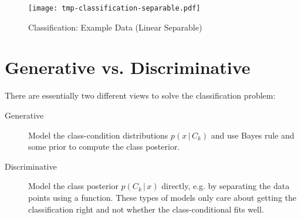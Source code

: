 \documentclass[a4paper, 11pt, accentcolor = tud3b]{tudreport}
\newcommand{\given}{\ensuremath{\,\vert\,}}
\begin{document}
		\begin{figure}
			\centering
			\texttt{[image: tmp-classification-separable.pdf]}
			\caption{Classification: Example Data (Linear Separable)}
			\label{fig:classificationExampleSeparable}
		\end{figure}

		\section{Generative vs. Discriminative}
			There are essentially two different views to solve the classification problem:
			\begin{description}
				\item[Generative] Model the class-condition distributions \( p(x \given C_k) \) and use Bayes rule and some prior to compute the class posterior.
				\item[Discriminative] Model the class posterior \( p(C_k \given x) \) directly, e.g. by separating the data points using a function. These types of models only care about getting the classification right and not whether the class-conditional fits well.
			\end{description}
\end{document}
